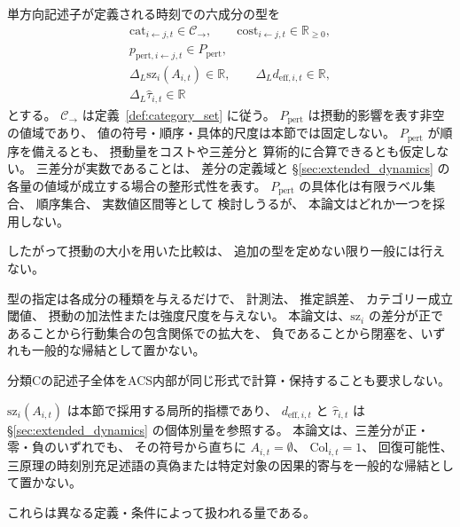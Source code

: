 \begin{definition}[単方向関係記述子の型]
\label{def:rel_unidirect_type}
単方向記述子が定義される時刻での六成分の型を
\[
\begin{gathered}
 \mathrm{cat}_{i\leftarrow j,t}\in\mathcal C_{\rightarrow},\qquad
 \mathrm{cost}_{i\leftarrow j,t}\in\mathbb R_{\ge0},\\
 p_{\mathrm{pert},i\leftarrow j,t}\in P_{\mathrm{pert}},\\
 \Delta_L\mathrm{sz}_i(A_{i,t})\in\mathbb R,\qquad
 \Delta_L d_{\mathrm{eff},i,t}\in\mathbb R,\\
 \Delta_L\widehat\tau_{i,t}\in\mathbb R
\end{gathered}
\]
とする。
$\mathcal C_{\rightarrow}$ は定義~\ref{def:category_set} に従う。
$P_{\mathrm{pert}}$ は摂動的影響を表す非空の値域であり、
値の符号・順序・具体的尺度は本節では固定しない。
$P_{\mathrm{pert}}$ が順序を備えるとも、
摂動量をコストや三差分と
算術的に合算できるとも仮定しない。
三差分が実数であることは、
差分の定義域と \S\ref{sec:extended_dynamics} の
各量の値域が成立する場合の整形式性を表す。
$P_{\mathrm{pert}}$ の具体化は有限ラベル集合、
順序集合、
実数値区間等として
検討しうるが、
本論文はどれか一つを採用しない。

したがって摂動の大小を用いた比較は、
追加の型を定めない限り一般には行えない。
\end{definition}

\begin{remark}[型指定の役割]
\label{rem:rel_unidirect_type_role}
型の指定は各成分の種類を与えるだけで、
計測法、
推定誤差、
カテゴリー成立閾値、
摂動の加法性または強度尺度を与えない。
本論文は、$\mathrm{sz}_i$ の差分が正であることから行動集合の包含関係での拡大を、
負であることから閉塞を、いずれも一般的な帰結として置かない。

分類Cの記述子全体をACS内部が同じ形式で計算・保持することも要求しない。
\end{remark}

\begin{remark}[関係性記述子と可行性関連量]
\label{rem:rel_descriptor_viability}
$\mathrm{sz}_i(A_{i,t})$ は本節で採用する局所的指標であり、
$ d_{\mathrm{eff},i,t}$ と $\widehat\tau_{i,t}$ は
\S\ref{sec:extended_dynamics} の個体別量を参照する。
本論文は、三差分が正・零・負のいずれでも、
その符号から直ちに
$A_{i,t}=\emptyset$、
$\mathrm{Col}_{i,t}=1$、
回復可能性、
三原理の時刻別充足述語の真偽または特定対象の因果的寄与を一般的な帰結として置かない。

これらは異なる定義・条件によって扱われる量である。
\end{remark}

